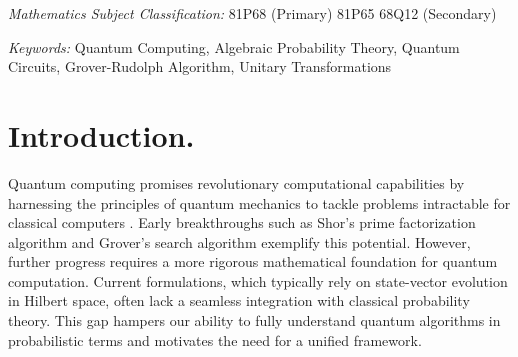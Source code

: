 \documentclass[a4paper,11pt]{article}
\begin{document}
\begin{abstract}
In this work, we develop a novel mathematical framework for universal digital quantum computation using algebraic probability theory. We rigorously define quantum circuits as finite sequences of elementary quantum gates and establish their role in implementing unitary transformations. A key result demonstrates that every unitary matrix in \(\mathrm{U}(N)\) can be expressed as a product of elementary quantum gates, leading to the concept of a universal dictionary for quantum computation.  We apply this framework to the construction of quantum circuits that encode probability distributions, focusing on the Grover-Rudolph algorithm. By leveraging controlled quantum gates and rotation matrices, we design a quantum circuit that approximates a given probability density function. Numerical simulations, conducted using Qiskit, confirm the theoretical predictions and validate the effectiveness of our approach. These results provide a rigorous foundation for quantum circuit synthesis within an algebraic probability framework and offer new insights into the encoding of probability distributions in quantum algorithms. Potential applications include quantum machine learning, circuit optimization, and experimental implementations on real quantum hardware.
\end{abstract}

\bigskip
\noindent\emph{Mathematics Subject Classification:} 81P68 (Primary) 81P65 68Q12 (Secondary)


\noindent \emph{Keywords:} Quantum Computing, Algebraic Probability Theory,
Quantum Circuits, Grover-Rudolph Algorithm, Unitary Transformations

\section{Introduction.}\label{sec1}

Quantum computing promises revolutionary computational capabilities by harnessing the principles of quantum mechanics to tackle problems intractable for classical computers \cite{Shor1997,Grover1996}. Early breakthroughs such as Shor’s prime factorization algorithm and Grover’s search algorithm exemplify this potential. However, further progress requires a more rigorous mathematical foundation for quantum computation. Current formulations, which typically rely on state-vector evolution in Hilbert space, often lack a seamless integration with classical probability theory. This gap hampers our ability to fully understand quantum algorithms in probabilistic terms and motivates the need for a unified framework.
\end{document}
